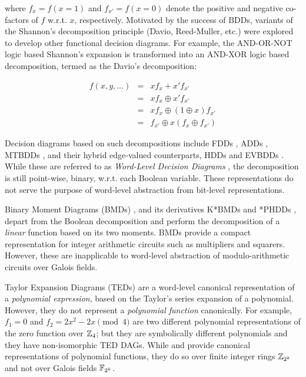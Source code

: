 where $f_x = f(x = 1)$ and $f_{x'} = f(x = 0)$ denote the positive and
negative co-factors of $f$ w.r.t. $x$, respectively. Motivated by the
success of BDDs,  variants of the Shannon's decomposition principle
(Davio, Reed-Muller, etc.) were explored to develop other functional
decision diagrams. For example, the AND-OR-NOT logic based Shannon's
expansion is transformed into an AND-XOR logic based decomposition,
termed as the Davio's decomposition:

\begin{eqnarray}
f(x, y, \dots) &=& x f_x + x' f_{x'}\\
& = & x f_x \oplus x' f_{x'}\\
& = & x f_x \oplus (1 \oplus x) f_{x'}\\
& = & f_{x'} \oplus x (f_x \oplus f_{x'})
\end{eqnarray}


Decision diagrams based on such decompositions include FDDs
\cite{okfdd}, ADDs \cite{add}, MTBDDs \cite{mtbdd}, and their hybrid 
edge-valued counterparts, HDDs \cite{hdd} and EVBDDs \cite{evbdd}. 
While these are referred to as {\it Word-Level Decision Diagrams}
\cite{WLS}, the decomposition is still point-wise, binary, 
w.r.t. each Boolean variable. These representations do not
serve the purpose of word-level abstraction from bit-level
representations. 

Binary Moment Diagrams (BMDs) \cite{bmd}, and its derivatives K*BMDs
\cite{kbmd} and *PHDDs \cite{phdd}, depart from the Boolean
decomposition and perform the decomposition of a {\it linear} function
based on its two moments. BMDs provide a compact representation for
integer arithmetic circuits such as multipliers and squarers. However,
these are inapplicable to word-level abstraction of modulo-arithmetic
circuits over Galois fields. 


Taylor Expansion Diagrams (TEDs) \cite{ted_tcomp} are a
word-level canonical representation of a {\it polynomial expression},
based on the Taylor's series expansion of a polynomial. However, they do
not represent a {\it polynomial function} canonically. For example,
$f_1 = 0$ and $f_2 = 2x^2 - 2x \pmod{ 4}$ are two different polynomial
representations of the zero function over ${\mathbb{Z}}_4$; but they are
symbolically different polynomials and they have non-isomorphic TED
DAGs.  While \cite{namrata:phd}  and \cite{alizadeh:tcad2010} provide 
canonical representations of polynomial functions, they do so over
finite integer rings ${\mathbb{Z}}_{2^k}$ and not over Galois fields ${\mathbb{F}}_{2^k}$.


